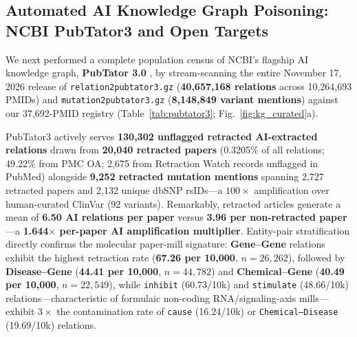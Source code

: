 \documentclass[11pt,letterpaper]{article}
\begin{document}
\subsection{Automated AI Knowledge Graph Poisoning: NCBI PubTator3 and Open Targets}
We next performed a complete population census of NCBI's flagship AI knowledge graph, \textbf{PubTator 3.0} \citep{wei2024_pubtator3}, by stream-scanning the entire November 17, 2026 release of \texttt{relation2pubtator3.gz} (\textbf{40,657,168 relations} across 10,264,693 PMIDs) and \texttt{mutation2pubtator3.gz} (\textbf{8,148,849 variant mentions}) against our 37,692-PMID registry (Table~\ref{tab:pubtator3}; Fig.~\ref{fig:kg_curated}a).

PubTator3 actively serves \textbf{130,302 unflagged retracted AI-extracted relations} drawn from \textbf{20,040 retracted papers} (0.3205\% of all relations; 49.22\% from PMC OA; 2,675 from Retraction Watch records unflagged in PubMed) alongside \textbf{9,252 retracted mutation mentions} spanning 2,727 retracted papers and 2,132 unique dbSNP rsIDs—a $100\times$ amplification over human-curated ClinVar (92 variants). Remarkably, retracted articles generate a mean of \textbf{6.50 AI relations per paper} versus \textbf{3.96 per non-retracted paper}—a \textbf{1.644$\times$ per-paper AI amplification multiplier}. Entity-pair stratification directly confirms the molecular paper-mill signature: \textbf{Gene--Gene} relations exhibit the highest retraction rate (\textbf{67.26 per 10,000}, $n=26{,}262$), followed by \textbf{Disease--Gene} (\textbf{44.41 per 10,000}, $n=44{,}782$) and \textbf{Chemical--Gene} (\textbf{40.49 per 10,000}, $n=22{,}549$), while \texttt{inhibit} (60.73/10k) and \texttt{stimulate} (48.66/10k) relations—characteristic of formulaic non-coding RNA/signaling-axis mills—exhibit $3\times$ the contamination rate of \texttt{cause} (16.24/10k) or \texttt{Chemical--Disease} (19.69/10k) relations.
\end{document}

